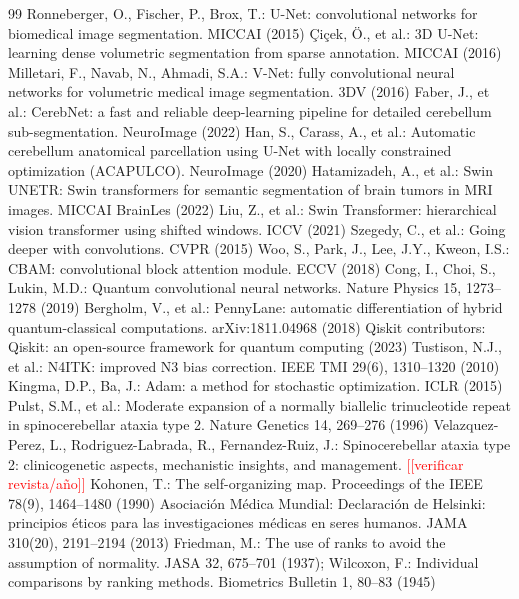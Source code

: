 \documentclass[runningheads]{llncs}
\newcommand{\todo}[1]{\textcolor{red}{[[#1]]}}
\begin{document}
\begin{thebibliography}{99}
 Ronneberger, O., Fischer, P., Brox, T.: U-Net: convolutional networks for biomedical image segmentation. MICCAI (2015)
 \c{C}i\c{c}ek, \"O., et al.: 3D U-Net: learning dense volumetric segmentation from sparse annotation. MICCAI (2016)
 Milletari, F., Navab, N., Ahmadi, S.A.: V-Net: fully convolutional neural networks for volumetric medical image segmentation. 3DV (2016)
 Faber, J., et al.: CerebNet: a fast and reliable deep-learning pipeline for detailed cerebellum sub-segmentation. NeuroImage (2022)
 Han, S., Carass, A., et al.: Automatic cerebellum anatomical parcellation using U-Net with locally constrained optimization (ACAPULCO). NeuroImage (2020)
 Hatamizadeh, A., et al.: Swin UNETR: Swin transformers for semantic segmentation of brain tumors in MRI images. MICCAI BrainLes (2022)
 Liu, Z., et al.: Swin Transformer: hierarchical vision transformer using shifted windows. ICCV (2021)
 Szegedy, C., et al.: Going deeper with convolutions. CVPR (2015)
 Woo, S., Park, J., Lee, J.Y., Kweon, I.S.: CBAM: convolutional block attention module. ECCV (2018)
 Cong, I., Choi, S., Lukin, M.D.: Quantum convolutional neural networks. Nature Physics 15, 1273--1278 (2019)
 Bergholm, V., et al.: PennyLane: automatic differentiation of hybrid quantum-classical computations. arXiv:1811.04968 (2018)
 Qiskit contributors: Qiskit: an open-source framework for quantum computing (2023)
 Tustison, N.J., et al.: N4ITK: improved N3 bias correction. IEEE TMI 29(6), 1310--1320 (2010)
 Kingma, D.P., Ba, J.: Adam: a method for stochastic optimization. ICLR (2015)
 Pulst, S.M., et al.: Moderate expansion of a normally biallelic trinucleotide repeat in spinocerebellar ataxia type 2. Nature Genetics 14, 269--276 (1996)
 Velazquez-Perez, L., Rodriguez-Labrada, R., Fernandez-Ruiz, J.: Spinocerebellar ataxia type 2: clinicogenetic aspects, mechanistic insights, and management. \todo{verificar revista/año}
 Kohonen, T.: The self-organizing map. Proceedings of the IEEE 78(9), 1464--1480 (1990)
 Asociación Médica Mundial: Declaración de Helsinki: principios éticos para las investigaciones médicas en seres humanos. JAMA 310(20), 2191--2194 (2013)
 Friedman, M.: The use of ranks to avoid the assumption of normality. JASA 32, 675--701 (1937); Wilcoxon, F.: Individual comparisons by ranking methods. Biometrics Bulletin 1, 80--83 (1945)
\end{thebibliography}
\end{document}
